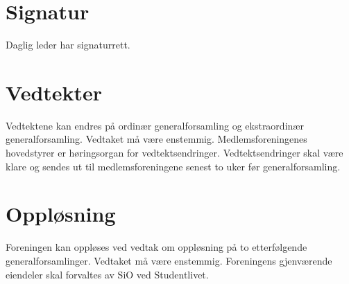 \documentclass[11pt]{article}
\begin{document}
\section{Signatur}
\label{sec:8}
Daglig leder har signaturrett.
\section{Vedtekter}
\label{sec:9}
Vedtektene kan endres på ordinær generalforsamling og ekstraordinær generalforsamling.
Vedtaket må være enstemmig. Medlemsforeningenes hovedstyrer er høringsorgan
for vedtektsendringer. Vedtektsendringer skal være klare og sendes ut til
medlemsforeningene senest to uker før generalforsamling.
\section{Oppløsning}
\label{sec:10}
Foreningen kan oppløses ved vedtak om oppløsning på to etterfølgende generalforsamlinger.
Vedtaket må være enstemmig. Foreningens gjenværende eiendeler skal forvaltes
av SiO ved Studentlivet.
\end{document}
